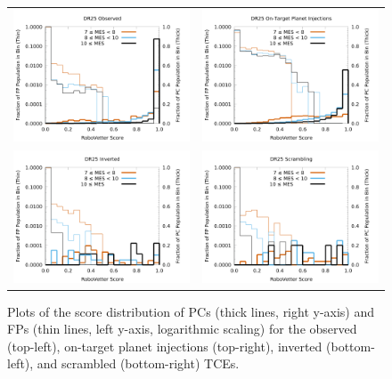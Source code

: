 \begin{figure}[htb]
\centering
\begin{tabular}{cc}
\includegraphics[width=0.5\linewidth]{Scores-OBS.pdf} &
\includegraphics[width=0.5\linewidth]{Scores-INJ1.pdf} \\
\includegraphics[width=0.5\linewidth]{Scores-INV.pdf} &
\includegraphics[width=0.5\linewidth]{Scores-SCR1.pdf} \\
\end{tabular}
\caption{Plots of the score distribution of PCs (thick lines, right y-axis) and FPs (thin lines, left y-axis, logarithmic scaling) for the observed (top-left), on-target planet injections (top-right), inverted (bottom-left), and scrambled (bottom-right) TCEs.}
\label{score-fig-2}
\end{figure}

